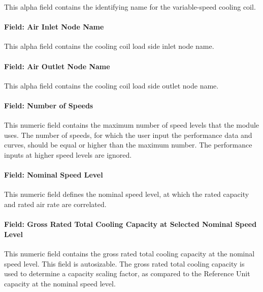 This alpha field contains the identifying name for the variable-speed cooling coil.

\paragraph{Field: Air Inlet Node Name}\label{field-air-inlet-node-name-12}

This alpha field contains the cooling coil load side inlet node name.

\paragraph{Field: Air Outlet Node Name}\label{field-air-outlet-node-name-12}

This alpha field contains the cooling coil load side outlet node name.

\paragraph{Field: Number of Speeds}\label{field-number-of-speeds-1}

This numeric field contains the maximum number of speed levels that the module uses. The number of speeds, for which the user input the performance data and curves, should be equal or higher than the maximum number. The performance inputs at higher speed levels are ignored.

\paragraph{Field: Nominal Speed Level}\label{field-nominal-speed-level}

This numeric field defines the nominal speed level, at which the rated capacity and rated air rate are correlated.

\paragraph{Field: Gross Rated Total Cooling Capacity at Selected Nominal Speed Level}\label{field-gross-rated-total-cooling-capacity-at-selected-nominal-speed-level}

This numeric field contains the gross rated total cooling capacity at the nominal speed level. This field is autosizable. The gross rated total cooling capacity is used to determine a capacity scaling factor, as compared to the Reference Unit capacity at the nominal speed level.

